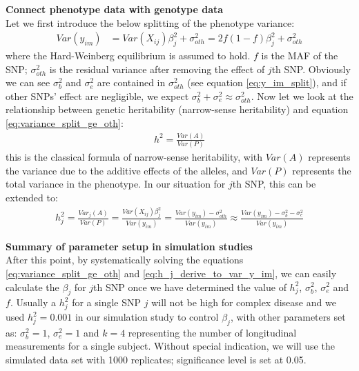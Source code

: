\documentclass[compress]{beamer}
\begin{document}
\begin{frame}[allowframebreaks]
\framebreak
\textbf{Connect phenotype data with genotype data}\\
Let we first introduce the below splitting of the phenotype variance:
\begin{align}
Var(y_{im} ) & = Var(X_{ij}) \beta_j^2 + \sigma_{oth} ^ 2  = 2f(1-f) \beta_j^2 + \sigma_{oth}^2
\label{eq:variance_split_ge_oth}
\end{align}
where the Hard-Weinberg equilibrium is assumed to hold. $f$ is the MAF of the SNP; $\sigma_{oth}^2$ is the residual variance after removing the effect of $j$th SNP. Obviously we can see $\sigma_b^2$ and $\sigma_e^2$ are contained in $\sigma_{oth}^2$ (see equation \eqref{eq:y_im_split}), and if other SNPs' effect are negligible, we expect $\sigma_b^2 + \sigma_e^2 \approx \sigma_{oth}^2$. Now let we look at the relationship between genetic heritability (narrow-sense heritability) and equation \eqref{eq:variance_split_ge_oth}:
\begin{align}
h^2 = \frac{Var(A)}{Var(P)}
\end{align}
this is the classical formula of narrow-sense heritability, with $Var(A)$ represents the variance due to the additive effects of the alleles, and $Var(P)$ represents the total variance in the phenotype. In our situation for $j$th SNP, this can be extended to:
\begin{align}
h_j^2 = \frac{Var_j(A)}{Var(P)} = \frac{Var(X_{ij}) \beta_j^2 } {Var(y_{im} )} = \frac{Var(y_{im} ) - \sigma^2_{oth} } {Var(y_{im} )} \approx \frac{Var(y_{im} ) - \sigma_b^2 - \sigma_e^2 } {Var(y_{im} )}
\label{eq:h_j_derive_to_var_y_im}
\end{align}

\framebreak
\textbf{Summary of parameter setup in simulation studies}\\
After this point, by systematically solving the equations \eqref{eq:variance_split_ge_oth} and \eqref{eq:h_j_derive_to_var_y_im}, we can easily calculate the $\beta_j$ for $j$th SNP once we have determined the value of $h_j^2$, $\sigma_b^2$, $\sigma_e^2$ and $f$. Usually a $h_j^2$ for a single SNP $j$ will not be high for complex disease and we used $h_j^2 = 0.001$ in our simulation study to control $\beta_j$, with other parameters set as: $\sigma_b^2 = 1$, $\sigma_e^2 = 1$ and $k = 4$ representing the number of longitudinal measurements for a single subject. Without special indication, we will use the simulated data set with 1000 replicates; significance level is set at 0.05. \\ 
\end{frame}
\end{document}
